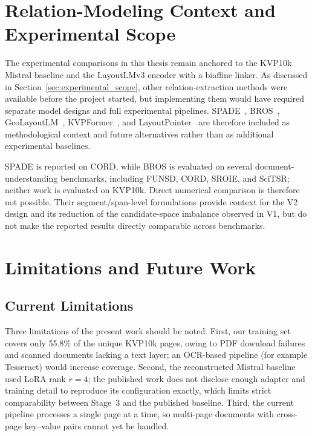\section{Relation-Modeling Context and Experimental Scope}
\label{sec:relation_context}

The experimental comparisons in this thesis remain anchored to the KVP10k
Mistral baseline and the LayoutLMv3 encoder with a biaffine linker. As discussed
in Section~\ref{sec:experimental_scope}, other relation-extraction methods were
available before the project started, but implementing them would have required
separate model designs and full experimental pipelines. SPADE~\cite{spade},
BROS~\cite{bros}, GeoLayoutLM~\cite{geolayoutlm},
KVPFormer~\cite{kvpformer}, and LayoutPointer~\cite{layoutpointer} are therefore
included as methodological context and future alternatives rather than as
additional experimental baselines.

SPADE is reported on CORD, while BROS is evaluated on several
document-understanding benchmarks, including FUNSD, CORD, SROIE, and SciTSR;
neither work is evaluated on KVP10k. Direct numerical comparison is therefore
not possible.
Their segment/span-level formulations provide context for the V2 design and
its reduction of the candidate-space imbalance observed in V1, but do not make
the reported results directly comparable across benchmarks.

\section{Limitations and Future Work}
\label{sec:limitations}

\subsection{Current Limitations}

Three limitations of the present work should be noted. First, our training set
covers only 55.8\% of the unique KVP10k pages, owing to PDF download failures
and scanned documents lacking a text layer; an OCR-based pipeline (for example
Tesseract) would increase coverage. Second, the reconstructed Mistral baseline
used LoRA rank $r = 4$; the published work does not disclose enough
adapter and training detail to reproduce its configuration exactly, which limits
strict comparability between Stage~3 and the published baseline. Third, the
current pipeline processes a single page at a time, so multi-page documents
with cross-page key--value pairs cannot yet be handled.

